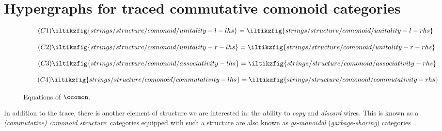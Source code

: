 \section{Hypergraphs for traced commutative comonoid categories}

\begin{figure}
    \centering
    \begin{minipage}{0.2\textwidth}
        \begin{equation}
            \tag{\(\mathsf{C1}\)}
            \iltikzfig{strings/structure/comonoid/unitality-l-lhs}
            =
            \iltikzfig{strings/structure/comonoid/unitality-l-rhs}
            \label{eq:comonoid-unitality-l}
        \end{equation}
    \end{minipage}
    \begin{minipage}{0.22\textwidth}
        \begin{equation}
            \tag{\(\mathsf{C2}\)}
            \iltikzfig{strings/structure/comonoid/unitality-r-lhs}
            =
            \iltikzfig{strings/structure/comonoid/unitality-r-rhs}
            \label{eq:comonoid-unitality-r}
        \end{equation}
    \end{minipage}
    \begin{minipage}{0.27\textwidth}
        \begin{equation}
            \tag{\(\mathsf{C3}\)}
            \iltikzfig{strings/structure/comonoid/associativity-lhs}
            =
            \iltikzfig{strings/structure/comonoid/associativity-rhs}
            \label{eq:comonoid-associativity}
        \end{equation}
    \end{minipage}
    \begin{minipage}{0.27\textwidth}
        \begin{equation}
            \tag{\(\mathsf{C4}\)}
            \iltikzfig{strings/structure/comonoid/commutativity-lhs}
            =
            \iltikzfig{strings/structure/comonoid/commutativity-rhs}
            \label{eq:comonoid-commutativity}
        \end{equation}
    \end{minipage}
    \caption{Equations of \(\ccomon\).}
    \label{fig:comonoid-equations}
\end{figure}

In addition to the trace, there is another element of structure we are
interested in: the ability to \emph{copy} and \emph{discard} wires.
This is known as a \emph{(commutative) comonoid structure}: categories equipped
with such a structure are also known as \emph{gs-monoidal}
(\emph{garbage-sharing}) categories~\cite{fritz2022free}.


